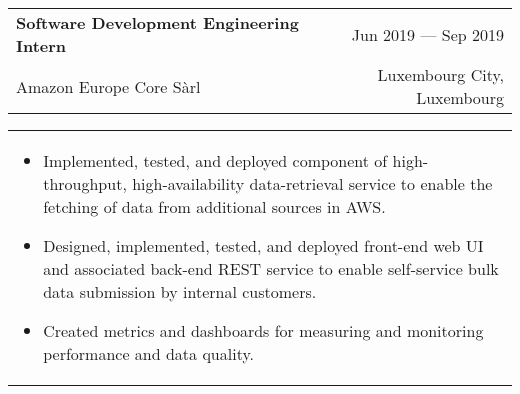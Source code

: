 \documentclass[11pt]{article}
\begin{document}
\begin{tabularx}{\textwidth}{X r}
    \textbf{Software Development Engineering Intern} & Jun 2019 --- Sep 2019 \\
    Amazon Europe Core S\`arl & Luxembourg City, Luxembourg \\
\end{tabularx}
\begin{tabularx}{\textwidth}{X}
    \begin{itemize}
        \item Implemented, tested, and deployed component of high-throughput,
            high-availability data-retrieval service to enable the fetching of data from
            additional sources in AWS.\@
        \item Designed, implemented, tested, and deployed front-end web UI and
            associated back-end REST service to enable self-service bulk data submission
            by internal customers.
        \item Created metrics and dashboards for measuring and monitoring performance
            and data quality.
    \end{itemize}
\end{tabularx}

\midrule
\end{document}

